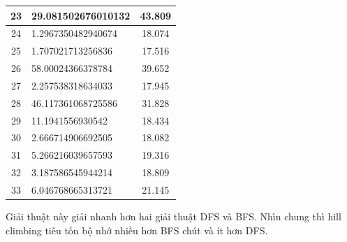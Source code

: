 \documentclass[a4paper, 11pt]{article}
\begin{document}
\begin{center}
\begin{tabular}{|c|l|c|}
		23       & 29.081502676010132  & 43.809       \\ \hline
		24       & 1.2967350482940674  & 18.074       \\ \hline
		25       & 1.707021713256836   & 17.516       \\ \hline
		26       & 58.00024366378784   & 39.652       \\ \hline
		27       & 2.257538318634033   & 17.945       \\ \hline
		28       & 46.117361068725586  & 31.828       \\ \hline
		29       & 11.1941556930542    & 18.434       \\ \hline
		30       & 2.666714906692505   & 18.082       \\ \hline
		31       & 5.266216039657593   & 19.316       \\ \hline
		32       & 3.187586545944214   & 18.809       \\ \hline
		33       & 6.046768665313721   & 21.145       \\ \hline
	\end{tabular}
\end{center}
Giải thuật này giải nhanh hơn hai giải thuật DFS và BFS. Nhìn chung thì hill climbing tiêu tốn bộ nhớ 
nhiều hơn BFS chút và ít hơn DFS.
\end{document}
